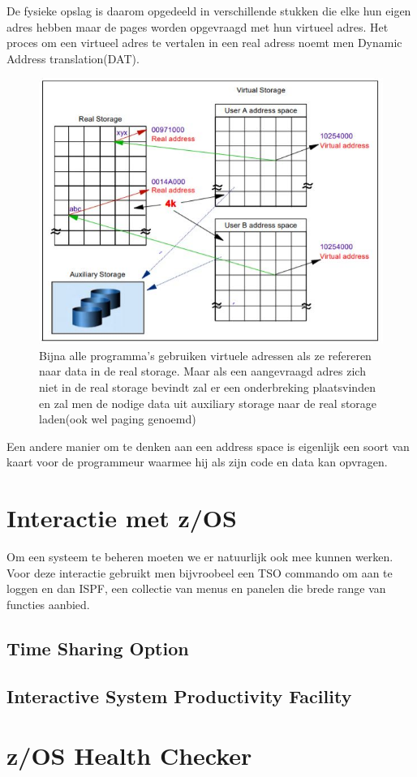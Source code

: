 De fysieke opslag is daarom opgedeeld in verschillende stukken die elke hun eigen adres hebben maar de pages worden opgevraagd met hun virtueel adres. Het proces om een virtueel adres te vertalen in een real adress noemt men Dynamic Address translation(DAT). \cite{Ebbers2011}

\begin{figure}[h]
	\centering
	\includegraphics{img/Storage}
	\caption[Visualisatie van het concept van virtuele storage]{Bijna alle programma's gebruiken virtuele adressen als ze refereren naar data in de real storage. Maar als een aangevraagd adres zich niet in de real storage bevindt zal er een onderbreking plaatsvinden en zal men de nodige data uit auxiliary storage naar de real storage laden(ook wel paging genoemd)}
	\label{fig:storage}
\end{figure}

Een andere manier om te denken aan een address space is eigenlijk een soort van kaart voor de programmeur waarmee hij als zijn code en data kan opvragen.

\section{Interactie met z/OS}
\label{sec:interactie met z/OS}

Om een systeem te beheren moeten we er natuurlijk ook mee kunnen werken. Voor deze interactie gebruikt men bijvroobeel een TSO commando om aan te loggen en dan ISPF, een collectie van menus en panelen die brede range van functies aanbied.

\subsection{Time Sharing Option}
\label{subsec:Time Sharing Option}

\subsection{Interactive System Productivity Facility}
\label{subsec:Interactive System Productivity Facility}

\section{z/OS Health Checker}
\label{sec:z/OS Health Checker}



